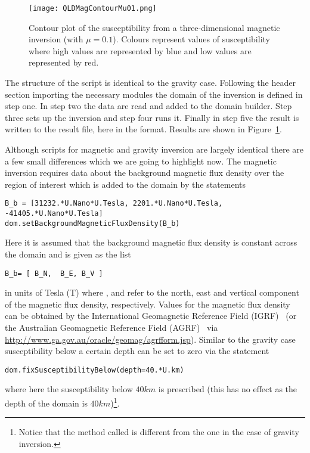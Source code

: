 \begin{figure}
\centering
\texttt{[image: QLDMagContourMu01.png]}
\caption{Contour plot of the susceptibility from a three-dimensional magnetic inversion (with $\mu=0.1$).
Colours represent values of susceptibility where high values are represented by
    blue and low values are represented by red.}
\label{FIG:P1:MAG:1}
\end{figure}

The structure of the script is identical to the gravity case.
Following the header section importing the necessary modules the domain of the
inversion is defined in step one.
In step two the data are read and added to the domain builder.
Step three sets up the inversion and step four runs it.
Finally in step five the result is written to the result file, here
 in the \VTK format.
Results are shown in Figure~\ref{FIG:P1:MAG:1}.

Although scripts for magnetic and gravity inversion are largely identical there
are a few small differences which we are going to highlight now.
The magnetic inversion requires data about the background magnetic flux density
over the region of interest which is added to the domain by the statements 
\begin{verbatim}
B_b = [31232.*U.Nano*U.Tesla, 2201.*U.Nano*U.Tesla, -41405.*U.Nano*U.Tesla]
dom.setBackgroundMagneticFluxDensity(B_b)
\end{verbatim}
Here it is assumed that the background magnetic flux density is constant across
the domain and is given as the list
\begin{verbatim}
B_b= [ B_N,  B_E, B_V ]
\end{verbatim}
in units of Tesla (T) where 
,  and  refer to the north, east and
vertical component of the magnetic flux density, respectively.
Values for the magnetic flux density can be obtained by the International
Geomagnetic Reference Field (IGRF)~\cite{IGRF} (or the Australian Geomagnetic
Reference Field (AGRF)~\cite{AGRF} via \url{http://www.ga.gov.au/oracle/geomag/agrfform.jsp}).
Similar to the gravity case susceptibility below a certain depth can be set to
zero via the statement
\begin{verbatim}
dom.fixSusceptibilityBelow(depth=40.*U.km)
\end{verbatim}
where here the susceptibility below $40km$ is prescribed (this has no effect as
the depth of the domain is $40km$)\footnote{Notice that the method called is
different from the one in the case of gravity inversion.}. 

